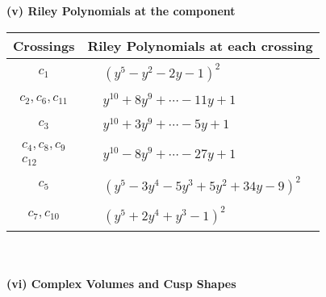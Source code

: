\documentclass[1p]{elsarticle_modified}
\theoremstyle{definition}
\begin{document}
\newpage\renewcommand{\arraystretch}{1}
\flushleft \textbf{(v) Riley Polynomials at the component}\newline \\
\begin{tabular}{m{50pt}|m{274pt}}
Crossings & \hspace{64pt}Riley Polynomials at each crossing \\
\hline $$\begin{aligned}c_{1}\end{aligned}$$&$\begin{aligned}
&(y^5- y^2-2 y-1)^2
\end{aligned}$\\
\hline $$\begin{aligned}c_{2},c_{6},c_{11}\end{aligned}$$&$\begin{aligned}
&y^{10}+8 y^9+\cdots-11 y+1
\end{aligned}$\\
\hline $$\begin{aligned}c_{3}\end{aligned}$$&$\begin{aligned}
&y^{10}+3 y^9+\cdots-5 y+1
\end{aligned}$\\
\hline $$\begin{aligned}c_{4},c_{8},c_{9}\\c_{12}\end{aligned}$$&$\begin{aligned}
&y^{10}-8 y^9+\cdots-27 y+1
\end{aligned}$\\
\hline $$\begin{aligned}c_{5}\end{aligned}$$&$\begin{aligned}
&(y^5-3 y^4-5 y^3+5 y^2+34 y-9)^2
\end{aligned}$\\
\hline $$\begin{aligned}c_{7},c_{10}\end{aligned}$$&$\begin{aligned}
&(y^5+2 y^4+y^3-1)^2
\end{aligned}$\\
\hline
\end{tabular}\\~\\
\newpage\flushleft \textbf{(vi) Complex Volumes and Cusp Shapes}
\end{document}
